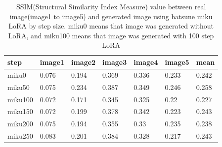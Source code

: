 \documentclass[extendedabs]{bmvc2k}
\begin{document}
\begin{table}[]
\centering
\begin{tabular}{|l|l|l|l|l|l|l|}
\hline
step    & image1 & image2 & image3 & image4 & image5 & mean  \\ \hline
miku0   & 0.076  & 0.194  & 0.369  & 0.336  & 0.233  & 0.242 \\ \hline
miku50  & 0.075  & 0.234  & 0.387  & 0.349  & 0.246  & 0.258 \\ \hline
miku100 & 0.072  & 0.171  & 0.345  & 0.325  & 0.22   & 0.227 \\ \hline
miku150 & 0.072  & 0.199  & 0.378  & 0.342  & 0.223  & 0.243 \\ \hline
miku200 & 0.075  & 0.194  & 0.355  & 0.33   & 0.235  & 0.238 \\ \hline
miku250 & 0.083  & 0.201  & 0.384  & 0.328  & 0.217  & 0.243 \\ \hline
\end{tabular}
\caption{SSIM(Structural Similarity Index Measure) value between real image(image1 to image5) and generated image using hatsune miku LoRA by step size. miku0 means that image was generated without LoRA, and miku100 means that image was generated with 100 step LoRA}
\label{tab:miku-ssim}
\end{table}
\end{document}
